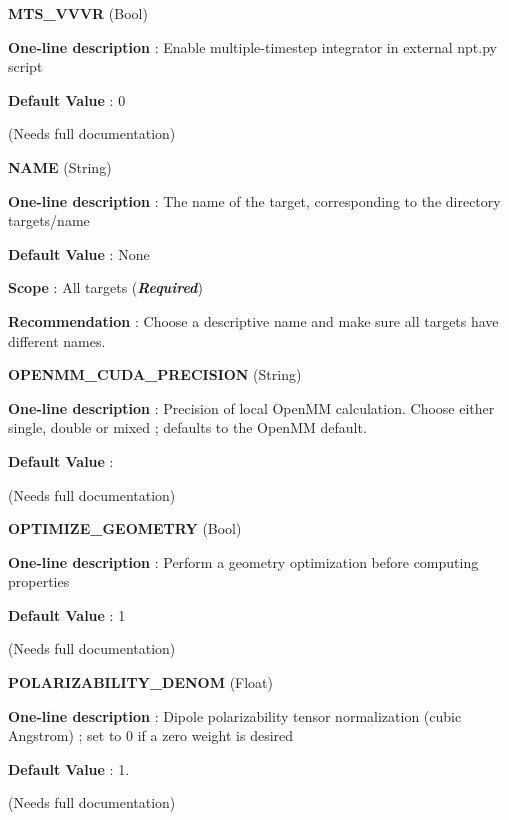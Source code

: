 \begin{DoxyItemize}
\item {\bfseries  \-M\-T\-S\-\_\-\-V\-V\-V\-R } (\-Bool) \par
{\bfseries  \-One-\/line description }\-: \-Enable multiple-\/timestep integrator in external npt.\-py script \par
{\bfseries  \-Default \-Value }\-: 0 \par
(\-Needs full documentation)\end{DoxyItemize}
\begin{DoxyItemize}
\item {\bfseries  \-N\-A\-M\-E } (\-String) \par
{\bfseries  \-One-\/line description }\-: \-The name of the target, corresponding to the directory targets/name \par
{\bfseries  \-Default \-Value }\-: \-None \par
{\bfseries  \-Scope }\-: \-All targets ({\bfseries {\itshape \-Required\/}}) \par
{\bfseries  \-Recommendation }\-: \-Choose a descriptive name and make sure all targets have different names.\end{DoxyItemize}
\begin{DoxyItemize}
\item {\bfseries  \-O\-P\-E\-N\-M\-M\-\_\-\-C\-U\-D\-A\-\_\-\-P\-R\-E\-C\-I\-S\-I\-O\-N } (\-String) \par
{\bfseries  \-One-\/line description }\-: \-Precision of local \-Open\-M\-M calculation. \-Choose either single, double or mixed ; defaults to the \-Open\-M\-M default. \par
{\bfseries  \-Default \-Value }\-: \par
(\-Needs full documentation)\end{DoxyItemize}
\begin{DoxyItemize}
\item {\bfseries  \-O\-P\-T\-I\-M\-I\-Z\-E\-\_\-\-G\-E\-O\-M\-E\-T\-R\-Y } (\-Bool) \par
{\bfseries  \-One-\/line description }\-: \-Perform a geometry optimization before computing properties \par
{\bfseries  \-Default \-Value }\-: 1 \par
(\-Needs full documentation)\end{DoxyItemize}
\begin{DoxyItemize}
\item {\bfseries  \-P\-O\-L\-A\-R\-I\-Z\-A\-B\-I\-L\-I\-T\-Y\-\_\-\-D\-E\-N\-O\-M } (\-Float) \par
{\bfseries  \-One-\/line description }\-: \-Dipole polarizability tensor normalization (cubic \-Angstrom) ; set to 0 if a zero weight is desired \par
{\bfseries  \-Default \-Value }\-: 1. \par
(\-Needs full documentation)\end{DoxyItemize}
